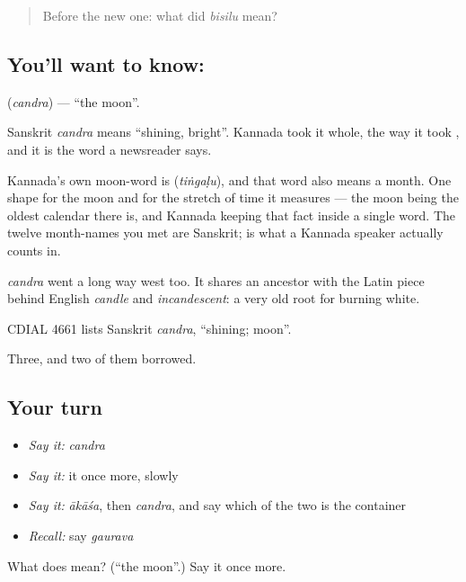 \label{lesson:KA-C53-moon}



\begin{quote}
Before the new one: what did \emph{bisilu} mean?
\end{quote}

\subsection*{You'll want to know: }
\textbf{} (\emph{candra}) — \textquotedblleft{}the moon\textquotedblright{}.

Sanskrit \emph{candra} means \textquotedblleft{}shining, bright\textquotedblright{}. Kannada took it whole, the way it took , and it is the word a newsreader says.

Kannada's own moon-word is  (\emph{tiṅgaḷu}), and that word also means a month. One shape for the moon and for the stretch of time it measures — the moon being the oldest calendar there is, and Kannada keeping that fact inside a single word. The twelve month-names you met are Sanskrit;  is what a Kannada speaker actually counts in.

\emph{candra} went a long way west too. It shares an ancestor with the Latin piece behind English \emph{candle} and \emph{incandescent}: a very old root for burning white.

CDIAL 4661 lists Sanskrit \emph{candra}, \textquotedblleft{}shining; moon\textquotedblright{}.

\begin{grammarlens}[title={What you've built}]
Three, and two of them borrowed.
\end{grammarlens}

\subsection*{Your turn}
\begin{itemize}
\raggedright
  \item \emph{Say it:} \emph{candra}
  \item \emph{Say it:} it once more, slowly
  \item \emph{Say it:} \emph{ākāśa}, then \emph{candra}, and say which of the two is the container
  \item \emph{Recall:} say \emph{gaurava}
\end{itemize}

\begin{tcolorbox}[breakable,colback=teal!4,colframe=teal!35!black,title={Before you move on}]
What does  mean? (\textquotedblleft{}the moon\textquotedblright{}.) Say it once more.
\end{tcolorbox}
